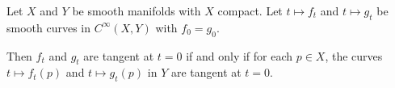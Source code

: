 Let $X$ and $Y$ be smooth manifolds with $X$ compact. Let $t \mapsto f_t$ and $t \mapsto g_t$ be smooth curves in $C^\infty(X, Y)$ with $f_0 = g_0$.

Then $f_t$ and $g_t$ are tangent at $t = 0$ if and only if for each $p \in X$, the curves $t \mapsto f_t(p)$ and $t \mapsto g_t(p)$ in $Y$ are tangent at $t = 0$.
